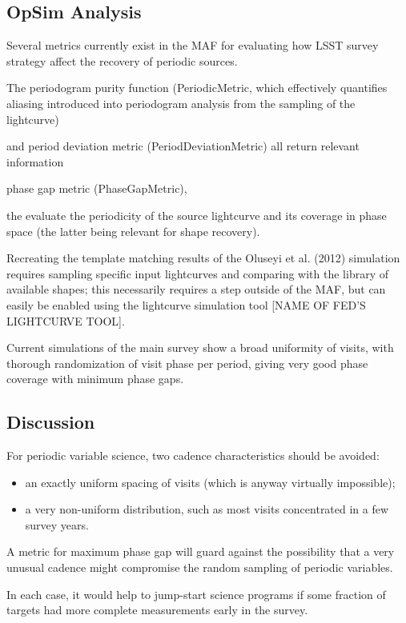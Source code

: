 
\subsection{OpSim Analysis}
\label{sec:keyword:analysis}


Several metrics currently exist in the MAF for evaluating how LSST survey strategy affect the recovery of periodic sources. 

The periodogram purity function (PeriodicMetric, which effectively quantifies aliasing introduced into periodogram analysis from the sampling of the lightcurve)

and period deviation metric (PeriodDeviationMetric) all return relevant information 

phase gap metric (PhaseGapMetric),

the evaluate the periodicity of the source lightcurve and its coverage in phase space (the latter being relevant for shape recovery). 

Recreating the template matching results of the Oluseyi et al. (2012) simulation requires sampling specific input lightcurves and comparing with the library of available shapes; this necessarily requires a step outside of the MAF, but can easily be enabled using the lightcurve simulation tool [NAME OF FED'S LIGHTCURVE TOOL].
 



Current simulations of the main survey show a broad uniformity of visits, with thorough randomization of visit phase per period, giving very good phase coverage with minimum phase gaps.



\subsection{Discussion}
\label{sec:keyword:discussion}

For periodic variable science, two cadence characteristics should be avoided:
\begin{itemize}
\item an exactly uniform spacing of visits (which is anyway virtually impossible); \
\item a very non-uniform distribution, such as most visits concentrated in a few survey years.
 \end{itemize}

A metric for maximum phase gap will guard against the possibility that a very unusual cadence might compromise the random sampling of periodic variables.

In each case, it would help to jump-start science programs if some fraction of targets had more complete measurements early in the survey.



\navigationbar
